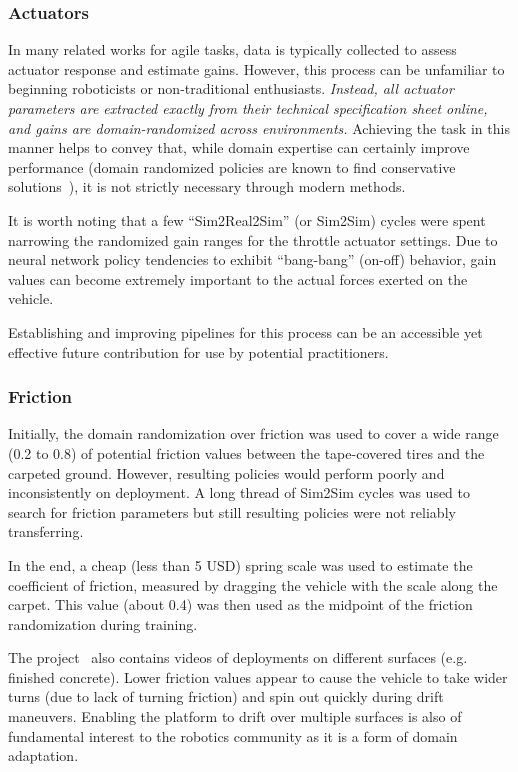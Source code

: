 \begin{appendices}
\subsubsection{Actuators} In many related works for agile tasks, data is typically collected to assess actuator response and estimate gains. However, this process can be unfamiliar to beginning roboticists or non-traditional enthusiasts. \textit{Instead, all actuator parameters are extracted exactly from their technical specification sheet online, and gains are domain-randomized across environments.} Achieving the task in this manner helps to convey that, while domain expertise can certainly improve performance (domain randomized policies are known to find conservative solutions~\cite{liao_berkeley_2024}), it is not strictly necessary through modern methods.

It is worth noting that a few ``Sim2Real2Sim'' (or Sim2Sim) cycles were spent narrowing the randomized gain ranges for the throttle actuator settings. Due to neural network policy tendencies to exhibit ``bang-bang'' (on-off) behavior, gain values can become extremely important to the actual forces exerted on the vehicle.

Establishing and improving pipelines for this process can be an accessible yet effective future contribution for use by potential practitioners.

\subsubsection{Friction}

Initially, the domain randomization over friction was used to cover a wide range (0.2 to 0.8) of potential friction values between the tape-covered tires and the carpeted ground. However, resulting policies would perform poorly and inconsistently on deployment. A long thread of Sim2Sim cycles was used to search for friction parameters but still resulting policies were not reliably transferring.

In the end, a cheap (less than 5 USD) spring scale was used to estimate the coefficient of friction, measured by dragging the vehicle with the scale along the carpet. This value (about 0.4) was then used as the midpoint of the friction randomization during training.

The project \website~also contains videos of deployments on different surfaces (e.g. finished concrete). Lower friction values appear to cause the vehicle to take wider turns (due to lack of turning friction) and spin out quickly during drift maneuvers. Enabling the platform to drift over multiple surfaces is also of fundamental interest to the robotics community as it is a form of domain adaptation.


\end{appendices}
